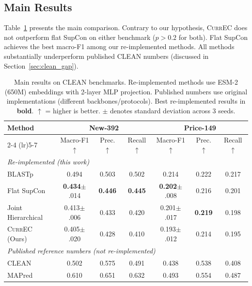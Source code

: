 \documentclass{article}
\newcommand{\currec}{\textsc{CurrEC}}
\begin{document}
\subsection{Main Results}

Table~\ref{tab:main} presents the main comparison. Contrary to our hypothesis, \currec{} does not outperform flat SupCon on either benchmark ($p > 0.2$ for both). Flat SupCon achieves the best macro-F1 among our re-implemented methods. All methods substantially underperform published CLEAN numbers (discussed in Section~\ref{sec:clean_gap}).

\begin{table}[t]
\caption{Main results on CLEAN benchmarks. Re-implemented methods use ESM-2 (650M) embeddings with 2-layer MLP projection. Published numbers use original implementations (different backbones/protocols). Best re-implemented results in \textbf{bold}. $\uparrow$ = higher is better. $\pm$ denotes standard deviation across 3 seeds.}
\label{tab:main}
\centering
\small
\begin{tabular}{lcccccc}
\toprule
\multirow{2}{*}{Method} & \multicolumn{3}{c}{New-392} & \multicolumn{3}{c}{Price-149} \\
\cmidrule(lr){2-4} \cmidrule(lr){5-7}
 & Macro-F1 $\uparrow$ & Prec. $\uparrow$ & Recall $\uparrow$ & Macro-F1 $\uparrow$ & Prec. $\uparrow$ & Recall $\uparrow$ \\
\midrule
\multicolumn{7}{l}{\textit{Re-implemented (this work)}} \\
BLASTp & 0.494 & 0.503 & 0.502 & 0.214 & 0.222 & 0.217 \\
Flat SupCon & \textbf{0.434}{\scriptsize $\pm$.014} & \textbf{0.446} & \textbf{0.445} & \textbf{0.202}{\scriptsize $\pm$.008} & 0.216 & 0.201 \\
Joint Hierarchical & 0.413{\scriptsize $\pm$.006} & 0.433 & 0.420 & 0.201{\scriptsize $\pm$.017} & \textbf{0.219} & 0.198 \\
\currec{} (Ours) & 0.405{\scriptsize $\pm$.020} & 0.428 & 0.410 & 0.193{\scriptsize $\pm$.012} & 0.214 & 0.195 \\
\midrule
\multicolumn{7}{l}{\textit{Published reference numbers (not re-implemented)}} \\
CLEAN \citep{yu2023enzyme} & 0.502 & 0.575 & 0.491 & 0.438 & 0.538 & 0.408 \\
MAPred \citep{rong2025autoregressive} & 0.610 & 0.651 & 0.632 & 0.493 & 0.554 & 0.487 \\
\bottomrule
\end{tabular}
\end{table}
\end{document}
